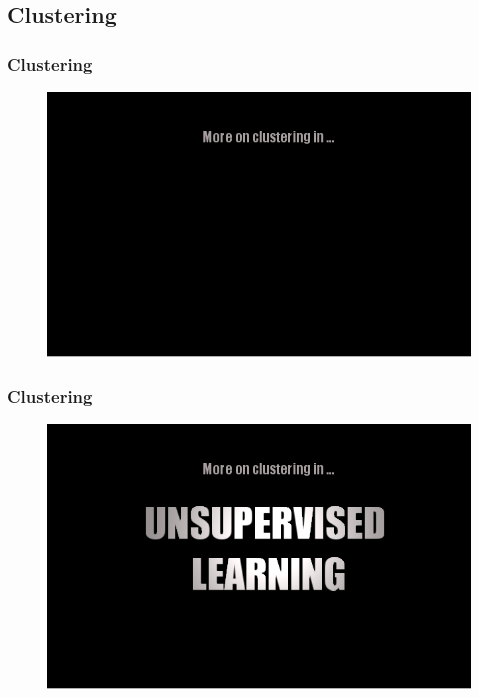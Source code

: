 \documentclass[table]{beamer}
\begin{document}


\subsection{Clustering}
\frame
{
	\frametitle{Clustering}
	\begin{figure}
		\includegraphics[scale=0.45]{fig/ulcs1.png}		
	\end{figure}
}
\frame
{
	\frametitle{Clustering}
	\begin{figure}
		\includegraphics[scale=0.45]{fig/ulcs2.png}		
	\end{figure}
}
\end{document}
